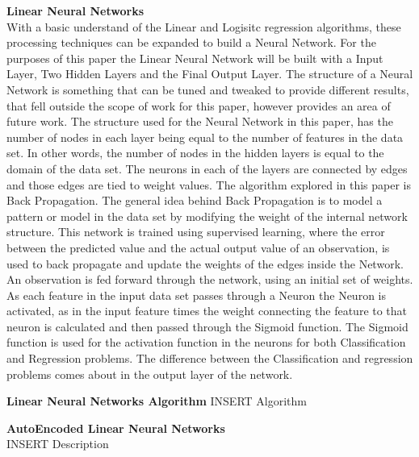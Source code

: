 \documentclass[twoside,11pt]{article}
\begin{document}
\hspace*{10mm} \textbf{Linear Neural Networks}\\
\hspace*{10mm} With a basic understand of the Linear and Logisitc regression algorithms, these processing techniques can be expanded to build a Neural Network. For the purposes of this paper the Linear Neural Network will be built with a Input Layer, Two Hidden Layers and the Final Output Layer. The structure of a Neural Network is something that can be tuned and tweaked to provide different results, that fell outside the scope of work for this paper, however provides an area of future work. The structure used for the Neural Network in this paper, has the number of nodes in each layer being equal to the number of features in the data set. In other words, the number of nodes in the hidden layers is equal to the domain of the data set. The neurons in each of the layers are connected by edges and those edges are tied to weight values. The algorithm explored in this paper is Back Propagation. The general idea behind Back Propagation is to model a pattern or model in the data set by modifying the weight of the internal network structure. This network is trained using supervised learning, where the error between the predicted value and the actual output value of an observation, is used to back propagate and update the weights of the edges inside the Network.\\
An observation is fed forward through the network, using an initial set of weights. As each feature in the input data set passes through a Neuron the Neuron is activated, as in the input feature times the weight connecting the feature to that neuron is calculated and then passed through the Sigmoid function. The Sigmoid function is used for the activation function in the neurons for both Classification and Regression problems. The difference between the Classification and regression problems comes about in the output layer of the network. 

\textbf{Linear Neural Networks Algorithm}\newline
\hspace*{10mm} INSERT Algorithm  \\

\newpage

\hspace*{10mm} \textbf{AutoEncoded Linear Neural Networks}\\
\hspace*{10mm} INSERT Description \\
\end{document}
